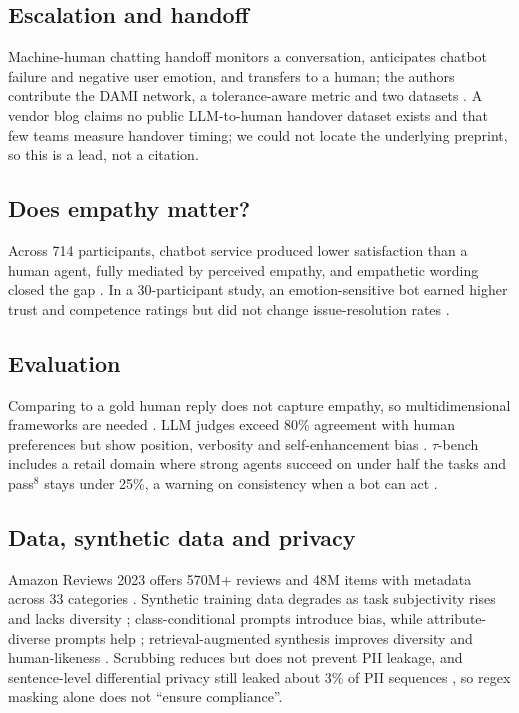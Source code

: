 \documentclass[11pt,a4paper]{article}
\begin{document}
\subsection{Escalation and handoff}
Machine-human chatting handoff monitors a conversation, anticipates chatbot failure and negative user emotion, and transfers to a human; the authors contribute the DAMI network, a tolerance-aware metric and two datasets \cite{liu2021handoff}. A vendor blog claims no public LLM-to-human handover dataset exists and that few teams measure handover timing; we could not locate the underlying preprint, so this is a lead, not a citation.

\subsection{Does empathy matter?}
Across 714 participants, chatbot service produced lower satisfaction than a human agent, fully mediated by perceived empathy, and empathetic wording closed the gap \cite{markovitch2024}. In a 30-participant study, an emotion-sensitive bot earned higher trust and competence ratings but did not change issue-resolution rates \cite{brun2025}.

\subsection{Evaluation}
Comparing to a gold human reply does not capture empathy, so multidimensional frameworks are needed \cite{raamkumar2024}. LLM judges exceed 80\% agreement with human preferences but show position, verbosity and self-enhancement bias \cite{zheng2023}. $\tau$-bench includes a retail domain where strong agents succeed on under half the tasks and pass$^8$ stays under 25\%, a warning on consistency when a bot can act \cite{yao2025}.

\subsection{Data, synthetic data and privacy}
Amazon Reviews 2023 offers 570M+ reviews and 48M items with metadata across 33 categories \cite{hou2024}. Synthetic training data degrades as task subjectivity rises and lacks diversity \cite{li2023synth}; class-conditional prompts introduce bias, while attribute-diverse prompts help \cite{yu2023}; retrieval-augmented synthesis improves diversity and human-likeness \cite{divekar2024}. Scrubbing reduces but does not prevent PII leakage, and sentence-level differential privacy still leaked about 3\% of PII sequences \cite{lukas2023}, so regex masking alone does not ``ensure compliance''.
\end{document}
